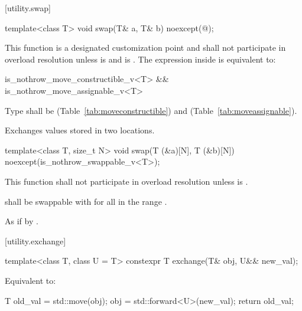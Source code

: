 [utility.swap]{}

%
\begin{itemdecl}
template<class T>
  void swap(T& a, T& b) noexcept(@\seebelow@);
\end{itemdecl}

\begin{itemdescr}
\pnum
\remarks This function
is a designated customization point and
shall not participate in overload resolution
unless  is  and
 is .
The expression inside  is equivalent to:

\begin{codeblock}
is_nothrow_move_constructible_v<T> && is_nothrow_move_assignable_v<T>
\end{codeblock}

\pnum
\requires
Type
shall be
 (Table~\ref{tab:moveconstructible})
and
 (Table~\ref{tab:moveassignable}).

\pnum
\effects
Exchanges values stored in two locations.
\end{itemdescr}

%
\begin{itemdecl}
template<class T, size_t N>
  void swap(T (&a)[N], T (&b)[N]) noexcept(is_nothrow_swappable_v<T>);
\end{itemdecl}

\begin{itemdescr}
\pnum
\remarks
This function shall not participate in overload resolution
unless  is .

\pnum
\requires
{} shall be swappable with 
for all  in the range .

\pnum
\effects As if by .
\end{itemdescr}

[utility.exchange]{}

%
\begin{itemdecl}
template<class T, class U = T>
  constexpr T exchange(T& obj, U&& new_val);
\end{itemdecl}

\begin{itemdescr}
\pnum
\effects
Equivalent to:
\begin{codeblock}
T old_val = std::move(obj);
obj = std::forward<U>(new_val);
return old_val;
\end{codeblock}
\end{itemdescr}


